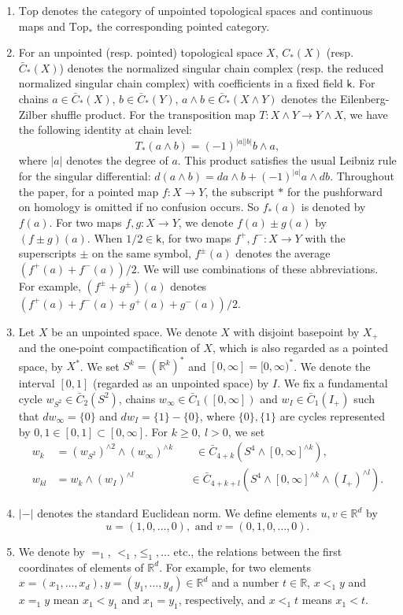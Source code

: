 \documentclass[reqno]{amsart}
\theoremstyle{definition}
\theoremstyle{plain}
\newcommand{\CG}{\mathrm{Top}}%
\newcommand{\RR}{\mathbb{R}}
\newcommand{\kk}{\mathsf{k}}
\begin{document}
\begin{enumerate}
\item $\CG$ denotes the category of unpointed topological spaces and continuous maps and $\CG_*$ the corresponding pointed category.

\item For an unpointed (resp. pointed) topological space $X$, $C_*(X)$ (resp. $\bar C_*(X)$) denotes the  normalized singular chain complex (resp. the reduced normalized singular chain complex) with coefficients in a fixed field $\kk$. For chains $a\in \bar C_*(X)$, $b\in \bar C_*(Y)$, $a\wedge b\in \bar C_*(X\wedge Y)$ denotes the Eilenberg-Zilber shuffle product. For the transposition map $T:X\wedge Y\to Y\wedge X$, we have the following identity at chain level:
\[
T_*(a\wedge b)=(-1)^{|a||b|}b\wedge a, 
\]
where $|a|$ denotes the degree of $a$. This product satisfies the usual Leibniz rule for the singular differential: $d(a\wedge b)=da\wedge b+(-1)^{|a|}a\wedge db$. Throughout the paper,  for a pointed map $f:X\to Y$, the subscript $*$ for the pushforward on homology is omitted if no confusion occurs.  So $f_*(a)$ is denoted by $f(a)$. For two maps $f,g:X\to Y$, we denote $f(a)\pm g(a)$ by $(f\pm g)(a)$. When $1/2\in \kk$, for two maps $f^+, f^-:X\to Y$ with the superscripts $\pm$ on the same symbol, $f^{\pm}(a)$ denotes the average $(f^+(a)+f^-(a))/2$. We will use  combinations of these abbreviations. For example, $(f^\pm+g^\pm)(a)$ denotes $(f^+(a)+f^-(a)+g^+(a)+g^-(a))/2$.

\item Let $X$ be an unpointed space. We denote  $X$ with disjoint basepoint by $X_+$ and the one-point compactification of $X$, which is also regarded as a pointed space,  by $X^*$. We set  $S^k=(\RR^k)^*$ and $[0,\infty]=[0,\infty)^*$.  We denote the interval $[0,1]$ (regarded as an unpointed space) by $I$. We fix a fundamental cycle $w_{S^2}\in \bar C_2(S^2)$, chains $w_{\infty}\in \bar C_1([0,\infty])$ and $w_I\in \bar C_1(I_+)$ such that $dw_\infty=\{0\}$ and $dw_I=\{1\}-\{0\}$, where $\{0\}, \{1\}$ are cycles represented by $0,1\in [0,1]\subset [0,\infty]$. For  $k\geq 0,\  l>0$, we set 
\[
\begin{split}
w_k&=(w_{S^2})^{\wedge 2}\wedge (w_\infty)^{\wedge k} \qquad \in \bar C_{4+k}(S^4\wedge [0,\infty]^{\wedge k}),\\
w_{k l}&=w_k\wedge (w_I)^{\wedge l}\qquad\qquad\quad \in \bar C_{4+k+l}(S^4\wedge [0,\infty]^{\wedge k}\wedge (I_+)^{\wedge l}).
\end{split}
\]
\item $|-|$ denotes the standard Euclidean norm. We define elements $u,v\in \RR^d$ by
\[
u=(1,0,\dots, 0), \text{ \ and \ } v=(0,1,0,\dots, 0).
\]
\item We denote by $=_1$, $<_1$,$\leq_1, \dots$ etc., the relations between the first coordinates of elements of $\RR^d$. For example,  for two elements $x=(x_1,\dots, x_d), y=(y_1,\dots, y_d)\in \RR^d$ and a number $t\in \RR$, $x<_1y$ and $x=_1y$ mean $x_1<y_1$ and $x_1=y_1$, respectively, and  $x<_1 t$ means $x_1< t$.

\end{enumerate}
\end{document}

